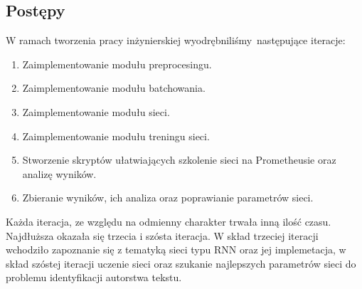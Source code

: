 \subsection{Postępy}
W ramach tworzenia pracy inżynierskiej wyodrębniliśmy następujące iteracje:
\begin{enumerate}
  \item Zaimplementowanie modułu preprocesingu.
  \item Zaimplementowanie modułu batchowania.
  \item Zaimplementowanie modułu sieci.
  \item Zaimplementowanie modułu treningu sieci.
  \item Stworzenie skryptów ułatwiających szkolenie sieci na Prometheusie oraz analizę wyników.
  \item Zbieranie wyników, ich analiza oraz poprawianie parametrów sieci.
\end{enumerate}

  Każda iteracja, ze względu na odmienny charakter trwała inną ilość czasu. Najdłuższa okazała się
trzecia i szósta iteracja. W skład trzeciej iteracji wchodziło zapoznanie się z tematyką sieci typu RNN oraz
jej implemetacja, w skład szóstej iteracji uczenie sieci oraz szukanie najlepszych parametrów sieci do problemu
identyfikacji autorstwa tekstu.

